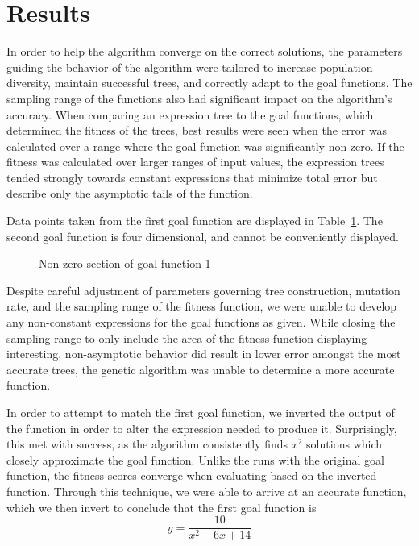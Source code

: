 
\section{Results}
\label{sec:results}

In order to help the algorithm converge on the correct solutions, the parameters guiding the behavior of the algorithm were tailored to increase population diversity, maintain successful trees, and correctly adapt to the goal functions.  The sampling range of the functions also had significant impact on the algorithm's accuracy.  When comparing an expression tree to the goal functions, which determined the fitness of the trees, best results were seen when the error was calculated over a range where the goal function was significantly non-zero.  If the fitness was calculated over larger ranges of input values, the expression trees tended strongly towards constant expressions that minimize total error but describe only the asymptotic tails of the function.  

Data points taken from the first goal function are displayed in Table~\ref{tab:fcn1}.  The second goal function is four dimensional, and cannot be conveniently displayed.

\begin{figure}
\centering
\caption{Non-zero section of goal function 1}
\label{tab:fcn1}
\end{figure}

Despite careful adjustment of parameters governing tree construction, mutation rate, and the sampling range of the fitness function, we were unable to develop any non-constant expressions for the goal functions as given.  While closing the sampling range to only include the area of the fitness function displaying interesting, non-asymptotic behavior did result in lower error amongst the most accurate trees, the genetic algorithm was unable to determine a more accurate function.  

In order to attempt to match the first goal function, we inverted the output of the function in order to alter the expression needed to produce it.  Surprisingly, this met with success, as the algorithm consistently finds $x^2$ solutions which closely approximate the goal function.  Unlike the runs with the original goal function, the fitness scores converge when evaluating based on the inverted function.  Through this technique, we were able to arrive at an accurate function, which we then invert to conclude that the first goal function is 
	$$ y = \frac{10}{x^2- 6x + 14} $$

